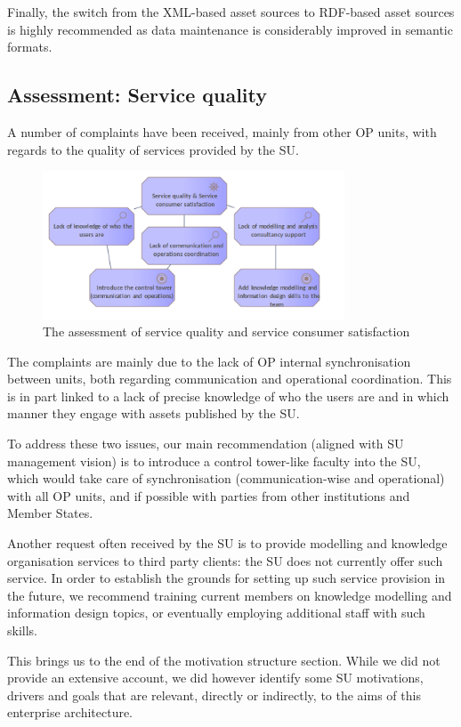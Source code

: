     Finally, the switch from the XML-based asset sources to RDF-based asset sources is highly recommended as data maintenance is considerably improved in semantic formats. 

	\subsection{Assessment: Service quality}

    A number of complaints have been received, mainly from other OP units, with regards to the quality of services provided by the SU. 

	\begin{figure}[h]
		\centering
		\includegraphics[width=0.8\textwidth]{images/motivation/Service quality.png}
		\caption{The assessment of service quality and service consumer satisfaction}
		\label{fig:service-quality}
	\end{figure}
	
	The complaints are mainly due to the lack of OP internal synchronisation between units, both regarding communication and operational coordination. This is in part linked to a lack of precise knowledge of who the users are and in which manner they engage with assets published by the SU. 
	
	
	To address these two issues, our main recommendation (aligned with SU management vision) is to introduce a control tower-like faculty into the SU, which would take care of synchronisation (communication-wise and operational) with all OP units, and if possible with parties from other institutions and Member States.
	
	Another request often received by the SU is to provide modelling and knowledge organisation services to third party clients: the SU does not currently offer such service. In order to establish the grounds for setting up such service provision in the future, we recommend training current members on knowledge modelling and information design topics, or eventually employing additional staff with such skills. 
	
	
	This brings us to the end of the motivation structure section. While we did not provide an extensive account, we did however identify some SU motivations, drivers and goals that are relevant, directly or indirectly, to the aims of this enterprise architecture.